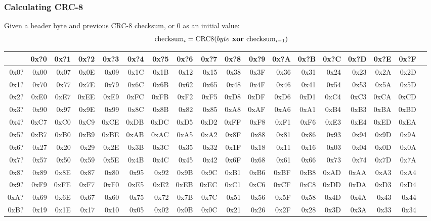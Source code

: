\subsubsection{Calculating CRC-8}
Given a header byte and previous CRC-8 checksum,
or 0 as an initial value:
\begin{equation*}
\text{checksum}_i = \text{CRC8}(byte\textbf{ xor }\text{checksum}_{i - 1})
\end{equation*}
\begin{table}[h]
{\ttfamily
\begin{tabular}{|r||r|r|r|r|r|r|r|r|r|r|r|r|r|r|r|r|r|}
\hline
 & 0x?0 & 0x?1 & 0x?2 & 0x?3 & 0x?4 & 0x?5 & 0x?6 & 0x?7 & 0x?8 & 0x?9 & 0x?A & 0x?B & 0x?C & 0x?D & 0x?E & 0x?F \\
\hline
0x0? & 0x00 & 0x07 & 0x0E & 0x09 & 0x1C & 0x1B & 0x12 & 0x15 & 0x38 & 0x3F & 0x36 & 0x31 & 0x24 & 0x23 & 0x2A & 0x2D \\
0x1? & 0x70 & 0x77 & 0x7E & 0x79 & 0x6C & 0x6B & 0x62 & 0x65 & 0x48 & 0x4F & 0x46 & 0x41 & 0x54 & 0x53 & 0x5A & 0x5D \\
0x2? & 0xE0 & 0xE7 & 0xEE & 0xE9 & 0xFC & 0xFB & 0xF2 & 0xF5 & 0xD8 & 0xDF & 0xD6 & 0xD1 & 0xC4 & 0xC3 & 0xCA & 0xCD \\
0x3? & 0x90 & 0x97 & 0x9E & 0x99 & 0x8C & 0x8B & 0x82 & 0x85 & 0xA8 & 0xAF & 0xA6 & 0xA1 & 0xB4 & 0xB3 & 0xBA & 0xBD \\
0x4? & 0xC7 & 0xC0 & 0xC9 & 0xCE & 0xDB & 0xDC & 0xD5 & 0xD2 & 0xFF & 0xF8 & 0xF1 & 0xF6 & 0xE3 & 0xE4 & 0xED & 0xEA \\
0x5? & 0xB7 & 0xB0 & 0xB9 & 0xBE & 0xAB & 0xAC & 0xA5 & 0xA2 & 0x8F & 0x88 & 0x81 & 0x86 & 0x93 & 0x94 & 0x9D & 0x9A \\
0x6? & 0x27 & 0x20 & 0x29 & 0x2E & 0x3B & 0x3C & 0x35 & 0x32 & 0x1F & 0x18 & 0x11 & 0x16 & 0x03 & 0x04 & 0x0D & 0x0A \\
0x7? & 0x57 & 0x50 & 0x59 & 0x5E & 0x4B & 0x4C & 0x45 & 0x42 & 0x6F & 0x68 & 0x61 & 0x66 & 0x73 & 0x74 & 0x7D & 0x7A \\
0x8? & 0x89 & 0x8E & 0x87 & 0x80 & 0x95 & 0x92 & 0x9B & 0x9C & 0xB1 & 0xB6 & 0xBF & 0xB8 & 0xAD & 0xAA & 0xA3 & 0xA4 \\
0x9? & 0xF9 & 0xFE & 0xF7 & 0xF0 & 0xE5 & 0xE2 & 0xEB & 0xEC & 0xC1 & 0xC6 & 0xCF & 0xC8 & 0xDD & 0xDA & 0xD3 & 0xD4 \\
0xA? & 0x69 & 0x6E & 0x67 & 0x60 & 0x75 & 0x72 & 0x7B & 0x7C & 0x51 & 0x56 & 0x5F & 0x58 & 0x4D & 0x4A & 0x43 & 0x44 \\
0xB? & 0x19 & 0x1E & 0x17 & 0x10 & 0x05 & 0x02 & 0x0B & 0x0C & 0x21 & 0x26 & 0x2F & 0x28 & 0x3D & 0x3A & 0x33 & 0x34 \\

\end{tabular}}
\end{table}
